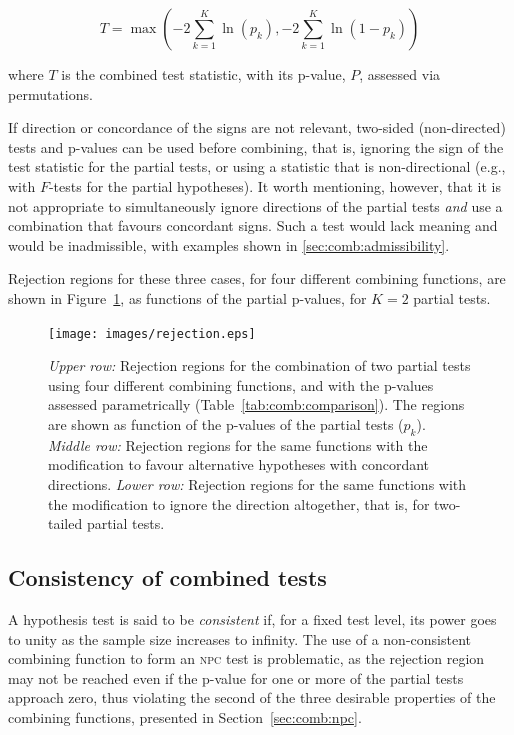 \begin{equation}
T = \max\left(-2\sum_{k=1}^{K} \ln\left(p_{k}\right),-2\sum_{k=1}^{K} \ln\left(1-p_{k}\right)\right)
\label{eqn:comb:pearson-david}
\end{equation}

\noindent
where $T$ is the combined test statistic, with its p-value, $P$, assessed via permutations.

If direction or concordance of the signs are not relevant, two-sided (non-directed) tests and p-values can be used before combining, that is, ignoring the sign of the test statistic for the partial tests, or using a statistic that is non-directional (e.g., with $F$-tests for the partial hypotheses). It worth mentioning, however, that it is not appropriate to simultaneously ignore directions of the partial tests \emph{and} use a combination that favours concordant signs. Such a test would lack meaning and would be inadmissible, with examples shown in \ref{sec:comb:admissibility}. 

Rejection regions for these three cases, for four different combining functions, are shown in Figure~\ref{fig:comb:rejection}, as functions of the partial p-values, for $K=2$ partial tests.

\begin{figure}[p]
\begin{center}
\centerline{\texttt{[image: images/rejection.eps]}}
\end{center}
\caption[Rejection regions of two partial tests with four different combining functions.]{
\emph{Upper row:} Rejection regions for the combination of two partial tests using four different combining functions, and with the p-values assessed parametrically (Table~\ref{tab:comb:comparison}). The regions are shown as function of the p-values of the partial tests ($p_k$).
\emph{Middle row:} Rejection regions for the same functions with the modification to favour alternative hypotheses with concordant directions.
\emph{Lower row:} Rejection regions for the same functions with the modification to ignore the direction altogether, that is, for two-tailed partial tests.}
\label{fig:comb:rejection}
\end{figure}

\subsection{Consistency of combined tests}
\label{sec:comb:consistency}

A hypothesis test is said to be \emph{consistent} if, for a fixed test level, its power goes to unity as the sample size increases to infinity. The use of a non-consistent combining function to form an \textsc{npc} test is problematic, as the rejection region may not be reached even if the p-value for one or more of the partial tests approach zero, thus violating the second of the three desirable properties of the combining functions, presented in Section~\ref{sec:comb:npc}.

